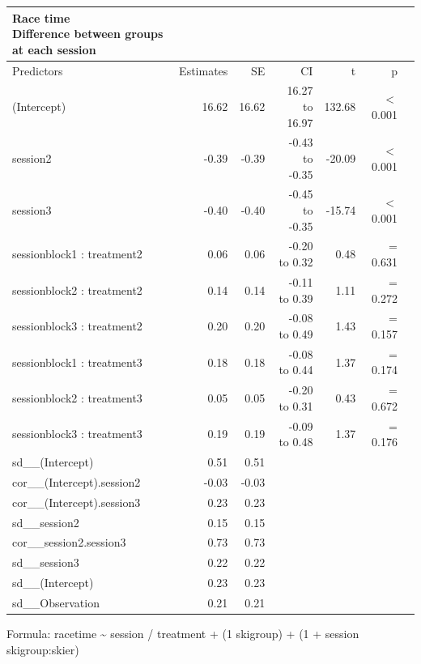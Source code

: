 \documentclass[pdflatex,sn-mathphys-num]{sn-jnl}%
\theoremstyle{thmstyleone}%
\theoremstyle{thmstyletwo}%
\theoremstyle{thmstylethree}%
\begin{document}
\begin{appendices}
\clearpage



\setlength{\LTpost}{0mm}
\begin{longtable}{lrrrrrl}\label{suptable_racetime_groupdiffeachsession}
\caption*{
{\large Race time} \\ 
{\small Difference between groups at each session}
} \\ 
\toprule
Predictors & Estimates & SE & CI & t & p \\ 
\midrule\addlinespace[2.5pt]
(Intercept) & 16.62 & 16.62 & 16.27 to 16.97 & 132.68 &  $<$ 0.001 \\ 
session2 & -0.39 & -0.39 & -0.43 to -0.35 & -20.09 &  $<$  0.001 \\ 
session3 & -0.40 & -0.40 & -0.45 to -0.35 & -15.74 &  $<$  0.001 \\ 
sessionblock1 : treatment2 & 0.06 & 0.06 & -0.20 to 0.32 & 0.48 &  =  0.631 \\ 
sessionblock2 : treatment2 & 0.14 & 0.14 & -0.11 to 0.39 & 1.11 &  =  0.272 \\ 
sessionblock3 : treatment2 & 0.20 & 0.20 & -0.08 to 0.49 & 1.43 &  =  0.157 \\ 
sessionblock1 : treatment3 & 0.18 & 0.18 & -0.08 to 0.44 & 1.37 &  =  0.174 \\ 
sessionblock2 : treatment3 & 0.05 & 0.05 & -0.20 to 0.31 & 0.43 &  =  0.672 \\ 
sessionblock3 : treatment3 & 0.19 & 0.19 & -0.09 to 0.48 & 1.37 &  =  0.176 \\ 
sd\_\_(Intercept) & 0.51 & 0.51 & & & & \\ 
cor\_\_(Intercept).session2 & -0.03 & -0.03 & & & & \\ 
cor\_\_(Intercept).session3 & 0.23 & 0.23 & & & &  \\ 
sd\_\_session2 & 0.15 & 0.15 & & & &  \\ 
cor\_\_session2.session3 & 0.73 & 0.73 & & & & \\ 
sd\_\_session3 & 0.22 & 0.22 & & & & \\ 
sd\_\_(Intercept) & 0.23 & 0.23 & & & & \\ 
sd\_\_Observation & 0.21 & 0.21 & & & & \\ 
\bottomrule
\end{longtable}
\begin{minipage}{\linewidth}
Formula: racetime \textasciitilde{} session / treatment + (1  \textbar{} skigroup) + (1 + session \textbar{} skigroup:skier)\\
\end{minipage}




\end{appendices}
\end{document}
